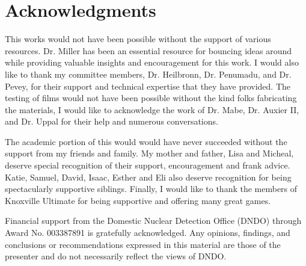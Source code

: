 \chapter*{Acknowledgments}

This works would not have been possible without the support of various resources.
Dr. Miller has been an essential resource for bouncing ideas around while providing valuable insights and encouragement for this work.
I would also like to thank my committee members, Dr. Heilbronn, Dr. Penumadu, and Dr. Pevey, for their support and technical expertise that they have provided. 
The testing of films would not have been possible without the kind folks fabricating the materials, I would like to acknowledge the work of Dr. Mabe, Dr. Auxier II, and Dr. Uppal for their help and numerous conversations.

The academic portion of this would would have never succeeded without the support from my friends and family. 
My mother and father, Lisa and Micheal, deserve special recognition of their support, encouragement and frank advice. 
Katie, Samuel, David, Isaac, Esther and Eli also deserve recognition for being spectacularly supportive siblings. 
Finally, I would like to thank the members of Knoxville Ultimate for being supportive and offering many great games.

Financial support from the Domestic Nuclear Detection Office (DNDO) through Award No. 003387891 is gratefully acknowledged. 
 Any opinions, findings, and conclusions or recommendations expressed in this material are those of the presenter and do not necessarily reflect the views of DNDO.